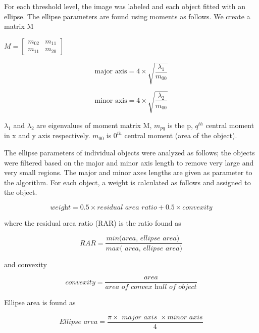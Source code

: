 \documentclass[journal]{IEEEtran}
\begin{document}
For each threshold level, the image was labeled and each object fitted with an ellipse. The ellipse parameters are found using moments \cite{burgerprinciples2009} as follows. We create a matrix M
  
$M = \begin{bmatrix}
m_{02}&m_{11} \\
m_{11}&m_{20}
\end{bmatrix}$

\begin{equation}
\text{major axis} = 4 \times \sqrt{\frac{\lambda_1}{m_{00}}}
\end{equation}

\begin{equation}
\text{minor axis} = 4 \times \sqrt{\frac{\lambda_2}{m_{00}}}
\end{equation}

$\lambda_1$ and $\lambda_2$ are eigenvalues of moment matrix M,  $m_{pq}$ is the p, $q^{th}$ central moment in x and y axis respectively.  $m_{00}$ is $0^{th}$ central moment (area of the object). 

The ellipse parameters of individual objects were analyzed as follows; the objects were filtered based on the major and minor axis length to remove very large and very small regions. The major and minor axes lengths are given as parameter to the algorithm. For each object, a weight is calculated as follows and assigned to the object.

\begin{equation}
\textit{weight} = 0.5 \times \textit{residual area ratio} + 0.5 \times convexity 
\end{equation}

where the residual area ratio (RAR) is the ratio found as

\begin{equation}
\textit{RAR} = \frac{\textit{min(area, ellipse area) }}{\textit{max( area, ellipse area)}}  
\end{equation}

and convexity

\begin{equation}
\textit{convexity} = \frac{\textit{ area }}{\textit{area of convex hull of object}}  
\end{equation}

Ellipse area is found as

\begin{equation}
\textit{Ellipse area} = \frac{ \pi \times \textit{ major axis }\times \textit{minor axis}}{4}  
\end{equation}
\end{document}
